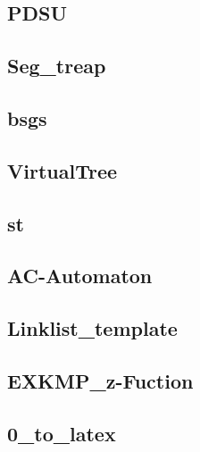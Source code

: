 \subsection{PDSU}
\raggedbottom
\hrulefill

\subsection{Seg\_treap}
\raggedbottom
\hrulefill

\subsection{bsgs}
\raggedbottom
\hrulefill

\subsection{VirtualTree}
\raggedbottom
\hrulefill

\subsection{st}
\raggedbottom
\hrulefill

\subsection{AC-Automaton}
\raggedbottom
\hrulefill

\subsection{Linklist\_template}
\raggedbottom
\hrulefill

\subsection{EXKMP\_z-Fuction}
\raggedbottom
\hrulefill

\subsection{0\_to\_latex}
\raggedbottom
\hrulefill

